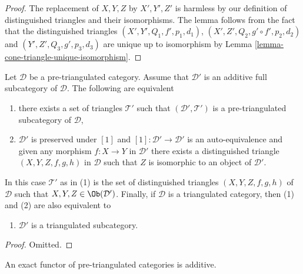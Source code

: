 \begin{proof}
The replacement of $X, Y, Z$ by $X', Y', Z'$ is harmless by our
definition of distinguished triangles and their isomorphisms.
The lemma follows from the fact that the distinguished triangles
$(X', Y', Q_1, f', p_1, d_1)$,
$(X', Z', Q_2, g' \circ f', p_2, d_2)$
and
$(Y', Z', Q_3, g', p_3, d_3)$
are unique up to isomorphism by
Lemma \ref{lemma-cone-triangle-unique-isomorphism}.
\end{proof}

\begin{lemma}
\label{lemma-triangulated-subcategory}
Let $\mathcal{D}$ be a pre-triangulated category.
Assume that $\mathcal{D}'$ is an additive full subcategory of $\mathcal{D}$.
The following are equivalent
\begin{enumerate}
\item there exists a set of triangles $\mathcal{T}'$ such that
$(\mathcal{D}', \mathcal{T}')$ is a pre-triangulated subcategory
of $\mathcal{D}$,
\item $\mathcal{D}'$ is preserved under $[1]$ and
$[1] : \mathcal{D}' \to \mathcal{D}'$ is an auto-equivalence and
given any morphism $f : X \to Y$ in $\mathcal{D}'$ there exists
a distinguished triangle $(X, Y, Z, f, g, h)$ in $\mathcal{D}$
such that $Z$ is isomorphic to an object of $\mathcal{D}'$.
\end{enumerate}
In this case $\mathcal{T}'$ as in (1) is the set of distinguished triangles
$(X, Y, Z, f, g, h)$ of $\mathcal{D}$ such that
$X, Y, Z \in \Ob(\mathcal{D}')$. Finally, if $\mathcal{D}$
is a triangulated category, then (1) and (2) are also equivalent to
\begin{enumerate}
\item[(3)] $\mathcal{D}'$ is a triangulated subcategory.
\end{enumerate}
\end{lemma}

\begin{proof}
Omitted.
\end{proof}

\begin{lemma}
\label{lemma-exact-functor-additive}
An exact functor of pre-triangulated categories is additive.
\end{lemma}

